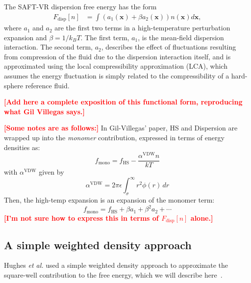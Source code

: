 \documentclass[letterpaper,twocolumn,amsmath,amssymb,pre,aps,10pt]{revtex4-1}
\newcommand\xx{\mathbf{x}}
\newcommand\fixme[1]{\textcolor{red}{\textbf{[#1]}}}
\begin{document}
The SAFT-VR dispersion free energy has the form~\cite{gil-villegas-1997-SAFT-VR}
\begin{align}
  F_\text{disp}[n] &= \int \left(a_1(\xx) + \beta a_2(\xx)\right)n(\xx)d\xx,
\end{align}
where $a_1$ and $a_2$ are the first two terms in a high-temperature
perturbation expansion and $\beta=1/k_BT$.  The first term, $a_1$, is
the mean-field dispersion interaction. The second term, $a_2$, describes the
effect of fluctuations resulting from compression of the fluid due
to the dispersion interaction itself, and is approximated
using the local compressibility approximation (LCA), which
assumes the energy fluctuation is simply related to the
compressibility of a hard-sphere reference fluid\cite{barker1976liquid}.

\fixme{Add here a complete exposition of this functional form,
  reproducing what Gil Villegas says.}

\fixme{Some notes are as follows:}
In Gil-Villegas' paper, HS and Dispersion are wrapped up into the \textit{monomer} contribution, expressed in terms of energy densities as:
\begin{equation}
  f_\text{mono} = f_\text{HS} - \frac{\alpha^\text{VDW}n}{kT}
\end{equation}
with $\alpha^\text{VDW}$ given by
\begin{equation}
  \alpha^\text{VDW} = 2\pi\epsilon\int_\sigma^\infty r^2\phi(r)\,dr
\end{equation}
Then, the high-temp expansion is an expansion of the monomer term:
\begin{equation}
  f_\text{mono} = f_\text{HS} + \beta a_1 + \beta^2 a_2 + \cdots
\end{equation}
\fixme{I'm not sure how to express this in terms of $F_\text{disp}[n]$ alone.}

\subsection{A simple weighted density approach}

Hughes \emph{et al.} used a simple weighted density approach to
approximate the square-well contribution to the free energy, which we
will describe here~\cite{hughes2013classical}.
\end{document}
